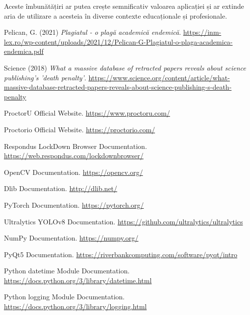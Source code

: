 \documentclass[12pt,a4paper]{article}
\begin{document}
Aceste îmbunătățiri ar putea crește semnificativ valoarea aplicației și ar extinde aria de utilizare a acesteia în diverse contexte educaționale și profesionale.

\begin{thebibliography}{9}
Pelican, G. (2021) 
\textit{Plagiatul - o plagă academică endemică}. 
\url{https://inm-lex.ro/wp-content/uploads/2021/12/Pelican-G-Plagiatul-o-plaga-academica-endemica.pdf}

Science (2018)
\textit{What a massive database of retracted papers reveals about science publishing's 'death penalty'}.
\url{https://www.science.org/content/article/what-massive-database-retracted-papers-reveals-about-science-publishing-s-death-penalty}

ProctorU Official Website. 
\url{https://www.proctoru.com/}

Proctorio Official Website. 
\url{https://proctorio.com/}

Respondus LockDown Browser Documentation. 
\url{https://web.respondus.com/lockdownbrowser/}

OpenCV Documentation. 
\url{https://opencv.org/}

Dlib Documentation. 
\url{http://dlib.net/}

PyTorch Documentation. 
\url{https://pytorch.org/}

Ultralytics YOLOv8 Documentation. 
\url{https://github.com/ultralytics/ultralytics}

NumPy Documentation. 
\url{https://numpy.org/}

PyQt5 Documentation. 
\url{https://riverbankcomputing.com/software/pyqt/intro}

Python datetime Module Documentation. 
\url{https://docs.python.org/3/library/datetime.html}

Python logging Module Documentation. 
\url{https://docs.python.org/3/library/logging.html}
\end{thebibliography}
\end{document}
